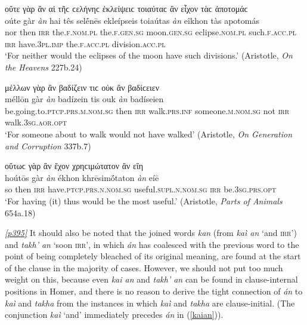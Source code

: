 \begin{exe}
\ex οὔτε γὰρ ἂν αἱ τῆϲ ϲελήνηϲ ἐκλείψειϲ τοιαύταϲ ἂν εἶχον τὰϲ ἀποτομάϲ\\
\gll oúte gàr \emph{àn} hai tês selḗnēs ekleípseis toiaútas \emph{àn} eîkhon tàs apotomás\\
nor then \textsc{irr} the.\textsc{f.nom.pl} the.\textsc{f.gen.sg} moon.\textsc{gen.sg} eclipse.\textsc{nom.pl} such.\textsc{f.acc.pl} \textsc{irr} have.\textsc{3pl.imp} the.\textsc{f.acc.pl} division.\textsc{acc.pl}\\
\trans `For neither would the eclipses of the moon have such divisions.' (Aristotle, \textit{On the Heavens} 227b.24)
\label{garan15}
\end{exe}

\begin{exe}
\ex μέλλων γὰρ ἂν βαδίζειν τιϲ οὐκ ἂν βαδίϲειεν\\
\gll méllōn gàr \emph{àn} badízein tis ouk \emph{àn} badíseien\\
be.going.to.\textsc{ptcp.prs.m.nom.sg} then \textsc{irr} walk.\textsc{prs.inf} someone.\textsc{m.nom.sg} not \textsc{irr} walk.\textsc{3sg.aor.opt}\\
\trans `For someone about to walk would not have walked' (Aristotle, \textit{On Generation and Corruption} 337b.7)
\label{garan16}
\end{exe}

\begin{exe}
\ex οὕτωϲ γὰρ ἂν ἔχον χρηϲιμώτατον ἂν εἴη\\
\gll hoútōs gàr \emph{àn} ékhon khrēsimṓtaton \emph{àn} eíē\\
so then \textsc{irr} have.\textsc{ptcp.prs.n.nom.sg} useful.\textsc{supl.n.nom.sg} \textsc{irr} be.\textsc{3sg.prs.opt}\\
\trans `For having (it) thus would be the most useful.' (Aristotle, \textit{Parts of Animals} 654a.18)
\label{garan17}
\end{exe}

\hyperlink{p395}{\emph{[p395]}} It should also be noted that the joined words \emph{kan} (from \emph{kaì an} `and \textsc{irr}') and \emph{takh' an} `soon \textsc{irr}', in which \emph{án} has coalesced with the previous word to the point of being completely bleached of its original meaning, are found at the start of the clause in the majority of cases. However, we should not put too much weight on this, because even \emph{kai an} and \emph{takh' an} can be found in clause-internal positions in Homer, and there is no reason to derive the tight connection of \emph{án} to \emph{kaì} and \emph{takha} from the instances in which \emph{kaì} and \emph{takha} are clause-initial. (The conjunction \emph{kaì} `and' immediately precedes \emph{án} in (\ref{kaian})).

